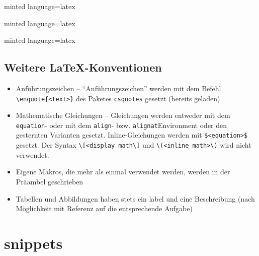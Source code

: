 \documentclass[
    titleprefix=AlgoTeX,
    inlineshortcut=java,
    corporatedesign,
    boxarc,
]{algoexercise}
\begin{document}
    \begin{minipage}{0.3\textwidth}
    \end{minipage}%
    \begin{minipage}{.7\textwidth}
        \begin{codeBlock}[]{minted language=latex}
        \end{codeBlock}
    \end{minipage}

    \begin{minipage}{0.3\textwidth}
    \end{minipage}%
    \begin{minipage}{.7\textwidth}
        \begin{codeBlock}[]{minted language=latex}
        \end{codeBlock}
    \end{minipage}

    \begin{minipage}{0.3\textwidth}
    \end{minipage}%
    \begin{minipage}{.7\textwidth}
        \begin{codeBlock}[]{minted language=latex}
        \end{codeBlock}
    \end{minipage}

    \clearpage
    \subsection{Weitere \LaTeX-Konventionen}
    \begin{itemize}
        \item Anführungszeichen -- \enquote{Anführungszeichen} werden mit dem Befehl \verb+\enquote{<text>}+ des Paketes
            \verb+csquotes+
            gesetzt (bereits geladen).
        \item Mathematische Gleichungen -- Gleichungen werden entweder mit dem \verb+equation+- oder mit dem \verb+align+- bzw.
            \verb+alignat+Environment oder den gesternten Varianten gesetzt.
            Inline-Gleichungen werden mit \verb+$<equation>$+ gesetzt.
            Der Syntax \verb+\[<display math\]+ und \verb+\(<inline math>\)+ wird nicht verwendet.
        \item Eigene Makros, die mehr als einmal verwendet werden, werden in der Präambel geschrieben
        \item Tabellen und Abbildungen haben stets ein label und eine Beschreibung (nach Möglichkeit mit Referenz auf die
            entsprechende Aufgabe)
    \end{itemize}
    \section{snippets}
    \clearpage{}
\end{document}
